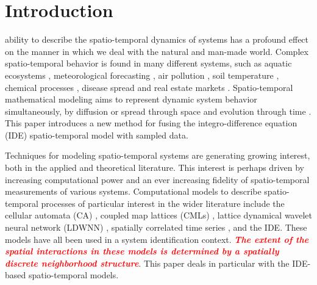 \documentclass[10pt,twocolumn,twoside]{IEEEtran}
\newcommand{\dean}[1]{\textsf{\emph{\textbf{\textcolor{red}{#1}}}}}
\begin{document}
%
\IEEEpeerreviewmaketitle



\section{Introduction}
 ability to describe the spatio-temporal dynamics of systems has a profound effect on the manner in which we deal with the natural and man-made world. Complex spatio-temporal behavior is found in many different systems, such as aquatic ecosystems \cite{Schofield2002}, meteorological forecasting \cite{Xu2005}, air pollution \cite{Romanowicz2006}, soil temperature  \cite{Bond-Lamberty2005}, chemical processes \cite{Deng2005}, disease spread \cite{Kuo2009} and real estate markets \cite{Pace2000,Sun2005}. Spatio-temporal mathematical modeling aims to represent dynamic system behavior simultaneously, by diffusion or spread through space and evolution through time \cite{Cressie2011}. This paper introduces a new method for fusing the integro-difference equation (IDE) spatio-temporal model with sampled data. %

Techniques for modeling spatio-temporal systems are generating growing interest, both in the applied and theoretical literature. This interest is perhaps driven by increasing computational power and an ever increasing fidelity of spatio-temporal measurements of various systems. Computational models to describe spatio-temporal processes of particular interest in the wider literature include the cellular automata (CA) \cite{Wolfram1994}, coupled map lattices (CMLs) \cite{Billings2002}, lattice dynamical wavelet neural network (LDWNN) \cite{Wei2009}, spatially correlated time series \cite{Pfeifer1980,Glasbey2008,Dewar2007}, and the IDE. These models have all been used in a system identification context. \dean{The extent of the spatial interactions in these models is determined by a spatially discrete neighborhood structure}. This paper deals in particular with the IDE-based spatio-temporal models. 
\end{document}
